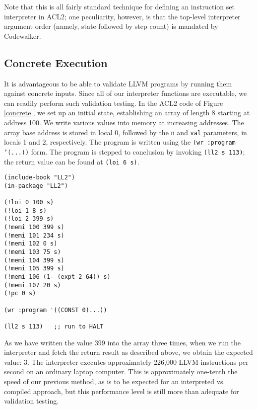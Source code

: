 \documentclass{eptcs}
\begin{document}
Note that this is all fairly standard technique for defining an 
instruction set interpreter in ACL2; one peculiarity, however, is that the
top-level interpreter argument order (namely, state followed by step count) 
is mandated by Codewalker.

\subsection{Concrete Execution}\label{exec}

It is advantageous to be able to validate LLVM programs by
running them against concrete inputs.  Since all of our interpreter functions are
executable, we can readily perform such validation testing.  In the ACL2 code
of Figure \ref{concrete}, we set up an initial state, establishing an
array of length 8 starting at address 100.  We write
various values into memory at increasing addresses.  The array base
address is stored in local 0, followed by the
\texttt{n} and \texttt{val} parameters, in locals 1 and 2,
respectively.  The program is written using the \texttt{(wr :program
  '(...))} form.  The program is stepped to conclusion by invoking 
\texttt{(ll2 s 113)}; the return value can be found at \texttt{(loi 6 s)}.

\begin{figure*}
\begin{verbatim}
(include-book "LL2")
(in-package "LL2")

(!loi 0 100 s)
(!loi 1 8 s)
(!loi 2 399 s)
(!memi 100 399 s)
(!memi 101 234 s)
(!memi 102 0 s)
(!memi 103 75 s)
(!memi 104 399 s)
(!memi 105 399 s)
(!memi 106 (1- (expt 2 64)) s)
(!memi 107 20 s)
(!pc 0 s)

(wr :program '((CONST 0)...))

(ll2 s 113)   ;; run to HALT
\end{verbatim}
\hrulefill
\caption{Concrete test case for the occurrences example.}
\label{concrete}
\end{figure*}

As we have written the value 399 into the array three times, when we
run the interpreter and fetch the return result as described above, we 
obtain the expected value: 3.  The interpreter executes approximately 
226,000 LLVM instructions per second on an ordinary laptop computer.  
This is approximately one-tenth the speed of our previous method, 
as is to be expected for an interpreted vs. compiled approach, but 
this performance level is still more than adequate for validation testing.
\end{document}
